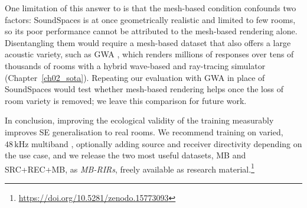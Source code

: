 One limitation of this answer to  is that the mesh-based condition
confounds two factors: SoundSpaces is at once geometrically realistic and
limited to few rooms, so its poor performance cannot be attributed to the
mesh-based rendering alone. Disentangling them would require a mesh-based
dataset that also offers a large acoustic variety, such as GWA
\citep{tang2022gwa}, which renders millions of responses over tens of thousands
of rooms with a hybrid wave-based and ray-tracing simulator
(Chapter~\ref{ch02_sota}). Repeating our evaluation with GWA in place of
SoundSpaces would test whether mesh-based rendering helps once the loss of room
variety is removed; we leave this comparison for future work.

In conclusion, improving the ecological validity of the training
 measurably improves \acrshort{SE} generalisation to real
rooms. We recommend training on varied, $48\,\text{kHz}$ multiband
, optionally adding source and receiver directivity depending on
the use case, and we release the two most useful datasets, MB and SRC+REC+MB, as
\emph{MB-RIRs}, freely available as research
material.\footnote{\url{https://doi.org/10.5281/zenodo.15773093}}
